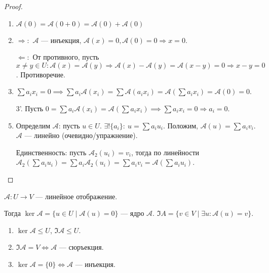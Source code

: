 \begin{proof}
     \begin{enumerate}
         \item $\mathcal{A}(0) = \mathcal{A}(0+0) = \mathcal{A}(0) + \mathcal{A}(0)$
         \item $\Rightarrow\!:$  $\mathcal{A}$ --- инъекция,  $\mathcal{A}(x) = 0, \mathcal{A}(0)=0 \Rightarrow x = 0$.

        $\Leftarrow\!:$ От противного, пусть $x \neq y \in U : \mathcal{A}(x) = \mathcal{A}(y) \Rightarrow \mathcal{A}(x) - \mathcal{A}(y) = \mathcal{A}(x - y) = 0 \Rightarrow x - y = 0$. Противоречие.
        \item  $\sum a_i x_i = 0 \implies \sum a_i \mathcal{A}(x_i) = \sum \mathcal{A}(a_i x_i) = \mathcal{A}(\sum a_i x_i) = \mathcal{A}(0) = 0$.
        \item[3'.] Пусть $0 = \sum a_i \mathcal{A}(x_i) = \mathcal{A}(\sum a_i x_i) \implies \sum a_i x_i = 0 \Rightarrow a_i = 0$.
        \item Определим $\mathcal{A}$: пусть  $u \in U$.  $\exists! \{a_i\}\!:\ u = \sum a_i u_i$. Положим,  $\mathcal{A}(u) = \sum a_i v_i$.  $\mathcal{A}$ --- линейно (очевидно/упражнение).

             Единственность: пусть  $\mathcal{A}_2(u_i) = v_i$, тогда  по линейности  $\mathcal{A}_2(\sum a_i u_i) = \sum a_i \mathcal{A}_2(u_i) = \sum a_i v_i = \mathcal{A}(\sum a_i u_i)$.
    \end{enumerate}
\end{proof}
\begin{definition}
    $\mathcal{A}\!: U \to V$ --- линейное отображение.

    Тогда  $\ker \mathcal{A} = \{ u \in U \mid \mathcal{A}(u) = 0\}$ --- ядро  $\mathcal{A}$.  $\Im A = \{ v \in V \mid \exists u: \mathcal{A}(u) = v\}$.
\end{definition}
\begin{properties}
    \begin{enumerate}
        \item $\ker \mathcal{A} \le U$, $\Im \mathcal{A} \le U$.
        \item $\Im \mathcal{A} = V \iff \mathcal{A}$ --- сюръекция.
        \item $\ker \mathcal{A} = \{0\} \iff \mathcal{A}$ --- инъекция.
    \end{enumerate}
\end{properties}
